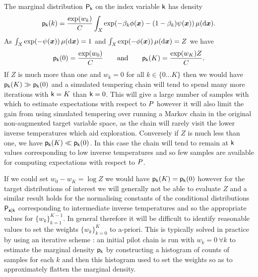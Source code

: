 The marginal distribution $\mathsf{P}_{\mathsf{k}}$ on the index variable $\mathsf{k}$ has density
\begin{equation}\label{eq:simulated-tempering-temp-index-marginal}
  \pden{\rvar{k}}(k) = 
  \frac{\exp(w_k)}{C} \int_{\set{X}} \exp\lpa -\beta_k\phi(\vct{x}) -(1-\beta_k)\psi(\vct{x})\rpa\,\mu(\dr\vct{x}).
\end{equation}
As $\int_{\set{X}}\exp\lpa-\psi(\vct{x})\rpa\,\mu(\dr\vct{x})=1$ and $\int_{\set{X}}\exp\lpa-\phi(\vct{x})\rpa\,\mu(\dr\vct{x})=Z$ we have 
\begin{equation}
  \mathsf{p}_{\mathsf{k}}(0) = \frac{\exp(w_0)}{C}
  \qquad\textrm{and}\qquad
  \mathsf{p}_{\mathsf{k}}(K) = \frac{\exp(w_K) Z}{C}.
\end{equation}
If $Z$ is much more than one and $w_k = 0$ for all $k \in \lbrace 0 \dots K\rbrace$ then we would have $\mathsf{p}_{\mathsf{k}}(K) \gg \mathsf{p}_{\mathsf{k}}(0)$ and a simulated tempering chain will tend to spend many more iterations with $\mathsf{k} = K$ than $\mathsf{k} = 0$. This will give a large number of samples with which to estimate expectations with respect to $P$ however it will also limit the gain from using simulated tempering over running a Markov chain in the original non-augmented target variable space, as the chain will rarely visit the lower inverse temperatures which aid exploration. Conversely if $Z$ is much less than one, we have $\mathsf{p}_{\mathsf{k}}(K) \ll \mathsf{p}_{\mathsf{k}}(0)$. In this case the chain will tend to remain at $\mathsf{k}$ values corresponding to low inverse temperatures and so few samples are available for computing expectations with respect to $P$.

If we could set $w_0 - w_K = \log Z$ we would have $\mathsf{p}_{\mathsf{k}}(K) = \mathsf{p}_{\mathsf{k}}(0)$ however for the target distributions of interest we will generally not be able to evaluate $Z$ and a similar result holds for the normalising constants of the conditional distributions $\mathsf{P}_{\boldsymbol{\mathsf{x}}|\mathsf{k}}$ corresponding to intermediate inverse temperatures and so the appropriate values for $\lbrace w_k \rbrace_{k=1}^{K-1}$. In general therefore it will be difficult to identify reasonable values to set the weights $\lbrace w_k \rbrace_{k=0}^K$ to a-priori. This is typically solved in practice by using an iterative scheme \citep{marinari1992simulated,iba2001extended}: an initial pilot chain is run with $w_k = 0 ~\forall k$ to estimate the marginal density $\mathsf{p}_{\mathsf{k}}$ by constructing a histogram of counts of samples for each $k$ and then this histogram used to set the weights so as to approximately flatten the marginal density. %

